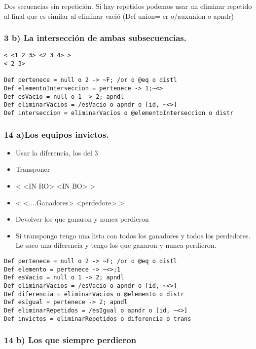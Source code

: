 Dos secuencias sin repetición. Si hay repetidos podemos usar un eliminar repetido al final que es similar al eliminar vació (Def union= er o/auxunion o apndr)


\subsubsection*{3 b) La intersección de ambas subsecuencias. }
\begin{verbatim}
< <1 2 3> <2 3 4> >
< 2 3>

Def pertenece = null o 2 -> ~F; /or o @eq o distl
Def elementoInterseccion = pertenece -> 1;~<>
Def esVacio = null o 1 -> 2; apndl
Def eliminarVacios = /esVacio o apndr o [id, ~<>]
Def interseccion = eliminarVacios o @elementoInterseccion o distr
\end{verbatim}


\subsubsection*{14 a)Los equipos invictos. }

\begin{itemize}
\item Usar la diferencia, los del 3
\item Transponer
\item < <IN RO> <IN BO> >
\item < <....Ganadores> <perdedore> >
\item Devolver los que ganaron y nunca perdieron
\item Si transpongo tengo una lista con todos los ganadores y todos los perdedores. Le saco una diferencia y tengo los que ganaron y nunca perdieron.
\end{itemize}

\begin{verbatim}
Def pertenece = null o 2 -> ~F; /or o @eq o distl
Def elemento = pertenece -> ~<>;1
Def esVacio = null o 1 -> 2; apndl
Def eliminarVacios = /esVacio o apndr o [id, ~<>]
Def diferencia = eliminarVacios o @elemento o distr
Def esIgual = pertenece -> 2; apndl
Def eliminarRepetidos = /esIgual o apndr o [id, ~<>]
Def invictos = eliminarRepetidos o diferencia o trans
\end{verbatim}



\subsubsection*{14 b) Los que siempre perdieron}

